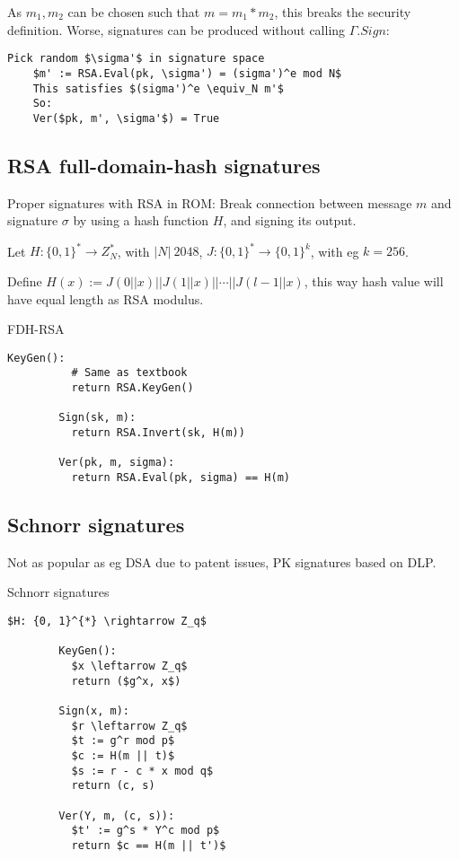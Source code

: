 \documentclass[a4paper]{scrreprt}
\begin{document}
As $m_1, m_2$ can be chosen such that $m = m_1 * m_2$, this breaks the security definition. Worse, signatures can be produced without calling $\Gamma.Sign$: 

\begin{lstlisting}[mathescape=true,autogobble=true]
	Pick random $\sigma'$ in signature space
	$m' := RSA.Eval(pk, \sigma') = (sigma')^e mod N$
	This satisfies $(sigma')^e \equiv_N m'$
	So:
	Ver($pk, m', \sigma'$) = True
\end{lstlisting}

\subsection{RSA full-domain-hash signatures}

Proper signatures with RSA in ROM: Break connection between message $m$ and
signature $\sigma$ by using a hash function $H$, and signing its output.

Let $H: \{0, 1\}^{*} \rightarrow Z_N^{*}$, with $|N| ~ 2048$, $J: \{0, 1\}^{*}
\rightarrow \{0, 1\}^k$, with eg $k = 256$.

Define $H(x) := J(0 || x) || J(1 || x) || \cdots || J(l - 1 || x)$, this way
hash value will have equal length as RSA modulus.

\begin{library}{FDH-RSA}
	\begin{lstlisting}[mathescape=true,autogobble=true]
		KeyGen():
		  # Same as textbook
		  return RSA.KeyGen()

		Sign(sk, m):
		  return RSA.Invert(sk, H(m))

		Ver(pk, m, sigma):
		  return RSA.Eval(pk, sigma) == H(m)
	\end{lstlisting}
\end{library}


\subsection{Schnorr signatures}

Not as popular as eg DSA due to patent issues, PK signatures based on DLP.

\begin{library}{Schnorr signatures}
	\begin{lstlisting}[mathescape=true,autogobble=true]
		$H: {0, 1}^{*} \rightarrow Z_q$

		KeyGen():
		  $x \leftarrow Z_q$
		  return ($g^x, x$)

		Sign(x, m):
		  $r \leftarrow Z_q$
		  $t := g^r mod p$
		  $c := H(m || t)$
		  $s := r - c * x mod q$
		  return (c, s)

		Ver(Y, m, (c, s)):
		  $t' := g^s * Y^c mod p$
		  return $c == H(m || t')$
	\end{lstlisting}
\end{library}
\end{document}
